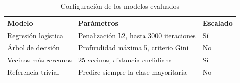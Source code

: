 \begin{table}[H]
\centering
\caption{Configuración de los modelos evaluados}
\label{tab:configuracion}
\small
\begin{tabular}{p{3.6cm} p{5.4cm} p{1.6cm}}
\toprule
\textbf{Modelo} & \textbf{Parámetros} & \textbf{Escalado} \\
\midrule
Regresión logística & Penalización L2, hasta 3000 iteraciones & Sí \\
Árbol de decisión & Profundidad máxima 5, criterio Gini & No \\
Vecinos más cercanos & 25 vecinos, distancia euclidiana & Sí \\
Referencia trivial & Predice siempre la clase mayoritaria & No \\
\bottomrule
\end{tabular}
\end{table}
